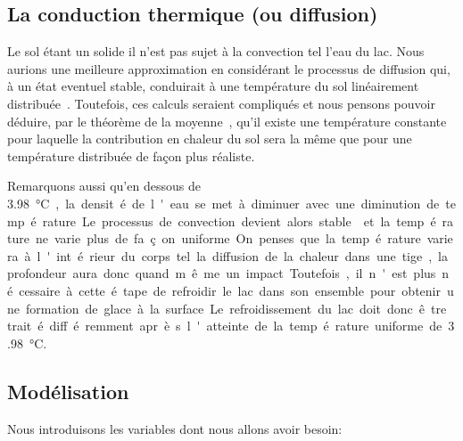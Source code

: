 \documentclass[12pt]{article}
\newcommand\critical{\SI{3.98}\celsius}
\numberwithin{figure}{section}
\begin{document}
\subsection{La conduction thermique (ou diffusion)}\label{Conduc}

Le sol \'etant un solide il n'est pas sujet \`a la convection tel l'eau du lac. Nous aurions une
meilleure approximation en consid\'erant le processus de diffusion qui, \`a un \'etat eventuel
stable, conduirait \`a une temp\'erature du sol lin\'eairement distribu\'ee~\cite{TempLinear}.
Toutefois, ces calculs seraient compliqu\'es et nous pensons pouvoir d\'eduire, par le th\'eor\`eme
de la moyenne~\cite{AvgValue}, qu'il existe une temp\'erature constante pour laquelle la
contribution en chaleur du sol sera la m\^eme que pour une temp\'erature distribu\'ee de fa\c con
plus r\'ealiste.

Remarquons aussi qu'en dessous de \critical, la densit\'e de l'eau se met \`a diminuer avec une
diminution de temp\'erature. Le processus de convection devient alors stable~\cite{HydroStab} et la
temp\'erature ne varie plus de fa\c con uniforme. On penses que la temp\'erature variera \`a
l'int\'erieur du corps tel la diffusion de la chaleur dans une tige, la profondeur aura donc quand
m\^eme un impact. Toutefois, il n'est plus n\'ecessaire \`a cette \'etape de refroidir le lac dans
son ensemble pour obtenir une formation de glace \`a la surface. Le refroidissement du lac doit donc
\^etre trait\'e diff\'eremment apr\`es l'atteinte de la temp\'erature uniforme de \critical.

\subsection{Mod\'elisation}

Nous introduisons les variables dont nous allons avoir besoin:
\end{document}
